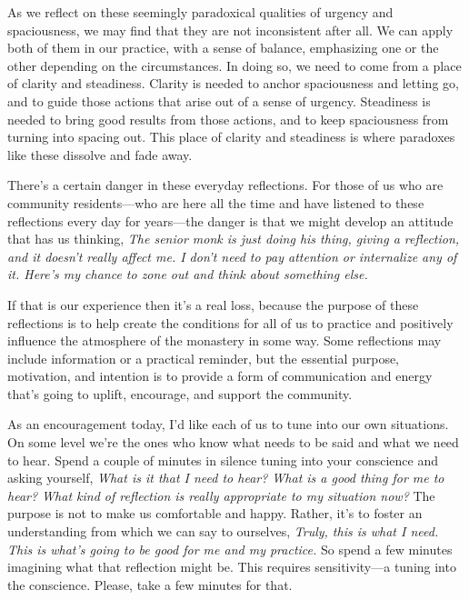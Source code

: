 As we reflect on these seemingly paradoxical qualities of urgency and 
spaciousness, we may find that they are not inconsistent after all. We 
can apply both of them in our practice, with a sense of balance, 
emphasizing one or the other depending on the circumstances. In doing 
so, we need to come from a place of clarity and steadiness. Clarity is 
needed to anchor spaciousness and letting go, and to guide those 
actions that arise out of a sense of urgency. Steadiness is needed to 
bring good results from those actions, and to keep spaciousness from 
turning into spacing out. This place of clarity and steadiness is where 
paradoxes like these dissolve and fade away.


There's a certain danger in these everyday reflections. For those of us 
who are community residents---who are here all the time and have 
listened to these reflections every day for years---the danger is that 
we might develop an attitude that has us thinking, \emph{The senior 
monk is just doing his thing, giving a reflection, and it doesn't 
really affect me. I don't need to pay attention or internalize any of 
it. Here's my chance to zone out and think about something else.}

If that is our experience then it's a real loss, because the purpose of 
these reflections is to help create the conditions for all of us to 
practice and positively influence the atmosphere of the monastery in 
some way. Some reflections may include information or a practical 
reminder, but the essential purpose, motivation, and intention is to 
provide a form of communication and energy that's going to uplift, 
encourage, and support the community.

As an encouragement today, I'd like each of us to tune into our own 
situations. On some level we're the ones who know what needs to be said 
and what we need to hear. Spend a couple of minutes in silence tuning 
into your conscience and asking yourself, \emph{What is it that I need 
to hear? What is a good thing for me to hear? What kind of reflection 
is really appropriate to my situation now?} The purpose is not to make 
us comfortable and happy. Rather, it's to foster an understanding from 
which we can say to ourselves, \emph{Truly, this is what I need. This 
is what's going to be good for me and my practice.} So spend a few 
minutes imagining what that reflection might be. This requires 
sensitivity---a tuning into the conscience. Please, take a few minutes 
for that.

